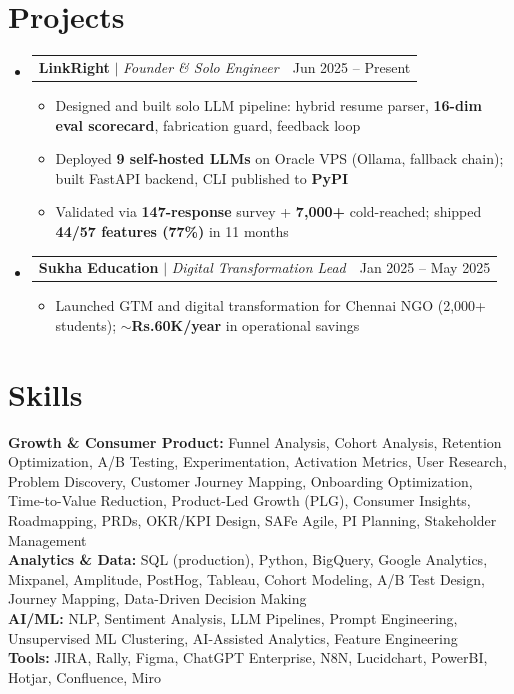 \documentclass[a4paper,10pt]{article}
\makeatletter
\newcommand{\resumeItem}[1]{
  \item\small{#1\vspace{-2pt}}
}
\newcommand{\resumeProjectHeading}[2]{
  \item
  \begin{tabular*}{0.97\textwidth}{l@{\extracolsep{\fill}}r}
    \small#1 & #2 \\
  \end{tabular*}\vspace{-7pt}
}
\newcommand{\resumeSubHeadingListStart}{\begin{itemize}[leftmargin=0.15in, label={}]}
\newcommand{\resumeSubHeadingListEnd}{\end{itemize}}
\newcommand{\resumeItemListStart}{\begin{itemize}\parfillskip=0pt}
\newcommand{\resumeItemListEnd}{\end{itemize}\vspace{-5pt}}
\makeatother
\begin{document}
\section{Projects}
\resumeSubHeadingListStart

  \resumeProjectHeading
    {\textbf{LinkRight} $|$ \emph{Founder \& Solo Engineer}}{Jun 2025 -- Present}
  \resumeItemListStart
    \resumeItem{Designed and built solo LLM pipeline: hybrid resume parser, \textbf{16-dim eval scorecard}, fabrication guard, feedback loop}
    \resumeItem{Deployed \textbf{9 self-hosted LLMs} on Oracle VPS (Ollama, fallback chain); built FastAPI backend, CLI published to \textbf{PyPI}}
    \resumeItem{Validated via \textbf{147-response} survey + \textbf{7,000+} cold-reached; shipped \textbf{44/57 features (77\%)} in 11 months}
  \resumeItemListEnd

  \resumeProjectHeading
    {\textbf{Sukha Education} $|$ \emph{Digital Transformation Lead}}{Jan 2025 -- May 2025}
  \resumeItemListStart
    \resumeItem{Launched GTM and digital transformation for Chennai NGO (2,000+ students); \textbf{$\sim$Rs.60K/year} in operational savings}
  \resumeItemListEnd

\resumeSubHeadingListEnd

\section{Skills}
\begin{itemize}[leftmargin=0.15in, label={}]
  \small{\item{
    \textbf{Growth \& Consumer Product:}{ Funnel Analysis, Cohort Analysis, Retention Optimization, A/B Testing, Experimentation, Activation Metrics, User Research, Problem Discovery, Customer Journey Mapping, Onboarding Optimization, Time-to-Value Reduction, Product-Led Growth (PLG), Consumer Insights, Roadmapping, PRDs, OKR/KPI Design, SAFe Agile, PI Planning, Stakeholder Management} \\
    \textbf{Analytics \& Data:}{ SQL (production), Python, BigQuery, Google Analytics, Mixpanel, Amplitude, PostHog, Tableau, Cohort Modeling, A/B Test Design, Journey Mapping, Data-Driven Decision Making} \\
    \textbf{AI/ML:}{ NLP, Sentiment Analysis, LLM Pipelines, Prompt Engineering, Unsupervised ML Clustering, AI-Assisted Analytics, Feature Engineering} \\
    \textbf{Tools:}{ JIRA, Rally, Figma, ChatGPT Enterprise, N8N, Lucidchart, PowerBI, Hotjar, Confluence, Miro}
  }}
\end{itemize}
\end{document}
